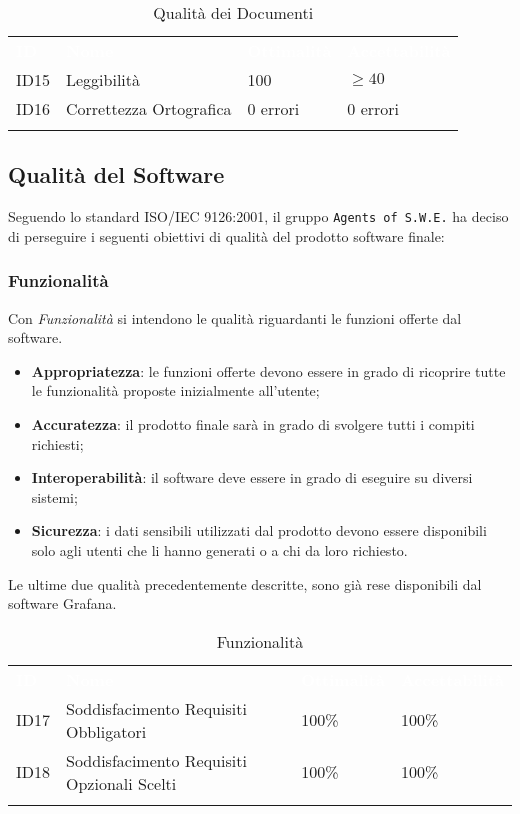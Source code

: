\begin{longtable}{|C{.15\textwidth}|C{.24\textwidth}|C{.24\textwidth}|C{.24\textwidth}|}
\hline
{}\textbf{\textcolor{white}{ID}} & \textbf{\textcolor{white}{Nome}} & \textbf{\textcolor{white}{Ottimalità}} & \textbf{\textcolor{white}{Accettabilità}}\\
ID15 & Leggibilità & 100 & $\geq 40$ \\
\hline
{}ID16 & Correttezza Ortografica & 0 errori & 0 errori \\ 
\hline
\caption{Qualità dei Documenti}
\label{QualitàDocumenti}
\end{longtable}

\subsection{Qualità del Software}

Seguendo lo standard ISO/IEC 9126:2001, il gruppo \texttt{Agents of S.W.E.} ha deciso di perseguire i seguenti obiettivi di qualità del prodotto software finale:


\subsubsection{Funzionalità}

Con \textit{Funzionalità} si intendono le qualità riguardanti le funzioni offerte dal software.
\begin{itemize}
	\item \textbf{Appropriatezza}: le funzioni offerte devono essere in grado di ricoprire tutte le funzionalità proposte inizialmente all'utente;
	\item \textbf{Accuratezza}: il prodotto finale sarà in grado di svolgere tutti i compiti richiesti;
	\item \textbf{Interoperabilità}: il software deve essere in grado di eseguire su diversi sistemi;
	\item \textbf{Sicurezza}: i dati sensibili utilizzati dal prodotto devono essere disponibili solo agli utenti che li hanno generati o a chi da loro richiesto. 
\end{itemize}
Le ultime due qualità precedentemente descritte, sono già rese disponibili dal software Grafana. 

\begin{longtable}{|C{.15\textwidth}|C{.24\textwidth}|C{.24\textwidth}|C{.24\textwidth}|}
\hline
{}\textbf{\textcolor{white}{ID}} & \textbf{\textcolor{white}{Nome}} & \textbf{\textcolor{white}{Ottimalità}} & \textbf{\textcolor{white}{Accettabilità}}\\
ID17 & Soddisfacimento Requisiti Obbligatori & 100\% & 100\%\\
\hline
{}ID18 & Soddisfacimento Requisiti Opzionali Scelti & 100\% & 100\% \\ 
\hline
\caption{Funzionalità}
\label{Funzionalità}
\end{longtable}

